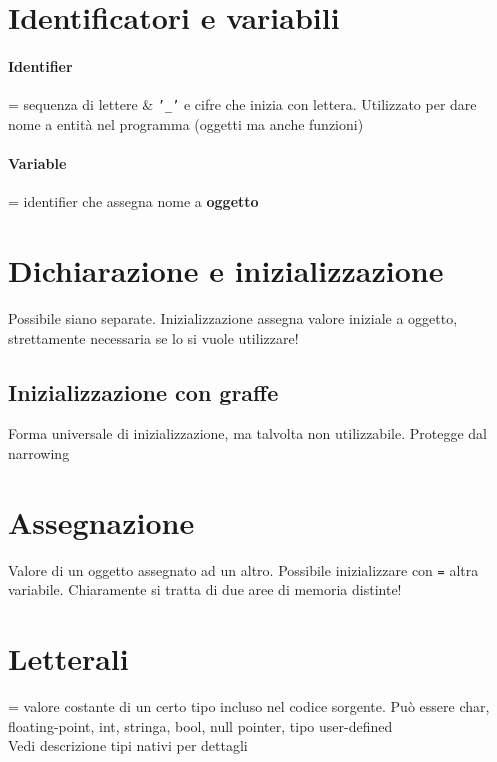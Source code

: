 \documentclass[10pt, oneside]{book}
\begin{document}
\section{Identificatori e variabili}
\paragraph{Identifier} = sequenza di lettere \& \texttt{'\_'} e cifre che inizia con lettera. Utilizzato per dare nome a entità nel programma (oggetti ma anche funzioni)
\paragraph{Variable} = identifier che assegna nome a \textbf{oggetto}

\section{Dichiarazione e inizializzazione}
Possibile siano separate. Inizializzazione assegna valore iniziale a oggetto, strettamente necessaria se lo si vuole utilizzare!
\subsection{Inizializzazione con graffe}
Forma universale di inizializzazione, ma talvolta non utilizzabile. Protegge dal narrowing

\section{Assegnazione}
Valore di un oggetto assegnato ad un altro. Possibile inizializzare con \texttt{=} altra variabile. Chiaramente si tratta di due aree di memoria distinte!

\section{Letterali}
= valore costante di un certo tipo incluso nel codice sorgente. Può essere char, floating-point, int, stringa, bool, null pointer, tipo user-defined\\
Vedi descrizione tipi nativi per dettagli
\end{document}
